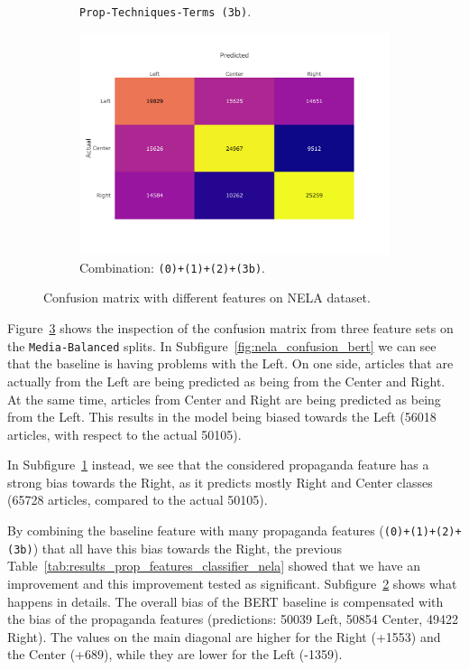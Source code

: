 \begin{figure}[!htbp]
\begin{subfigure}[b]{0.7\linewidth}
        \caption{\texttt{Prop-Techniques-Terms (3b)}.}
        \label{fig:nela_confusion_prop}
    \end{subfigure}
    \begin{subfigure}[b]{0.7\linewidth}
        \centering
        \includegraphics[trim={0 2cm 2cm 1cm},clip,width=\linewidth]{figures/nela_allsides_subset_media_balanced_confusion_matrix_bert,propaganda_total_percentage,propaganda_percentages,propaganda_techniques_tf_idf.pdf}
        \caption{Combination: \texttt{(0)+(1)+(2)+(3b)}.}
        \label{fig:nela_confusion_combined}
    \end{subfigure}
    \caption{Confusion matrix with different features on NELA dataset.}
    \label{fig:nela_confusion}
\end{figure}

Figure~\ref{fig:nela_confusion} shows the inspection of the confusion matrix from three feature sets on the \texttt{Media-Balanced} splits.
In Subfigure~\ref{fig:nela_confusion_bert} we can see that the baseline is having problems with the Left.
On one side, articles that are actually from the Left are being predicted as being from the Center and Right.
At the same time, articles from Center and Right are being predicted as being from the Left. This results in the model being biased towards the Left (56018 articles, with respect to the actual 50105).

In Subfigure~\ref{fig:nela_confusion_prop} instead, we see that the considered propaganda feature has a strong bias towards the Right, as it predicts mostly Right and Center classes (65728 articles, compared to the actual 50105).

By combining the baseline feature with many propaganda features (\texttt{(0)+(1)+(2)+(3b)}) that all have this bias towards the Right, the previous Table~\ref{tab:results_prop_features_classifier_nela} showed that we have an improvement and this improvement tested as significant.
Subfigure~\ref{fig:nela_confusion_combined} shows what happens in details. The overall bias of the BERT baseline is compensated with the bias of the propaganda features (predictions: 50039 Left, 50854 Center, 49422 Right).
The values on the main diagonal are higher for the Right (+1553) and the Center (+689), while they are lower for the Left (-1359).

